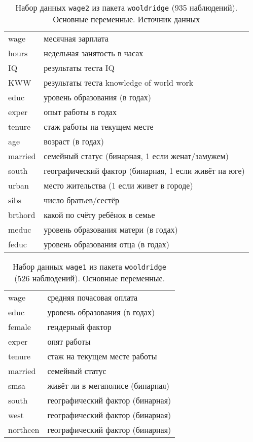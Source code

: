 \documentclass[12pt]{article}
\theoremstyle{remark}
\begin{document}
%
\begin{table}
	\caption{Набор данных \texttt{wage2} из пакета \texttt{wooldridge} (935  наблюдений).
	Основные переменные. Источник данных \cite{wage2}}
	\label{wage2}
	\begin{tabular}{l|l}\hline
	wage & месячная зарплата \\
	hours & недельная занятость в часах \\
	IQ & результаты теста IQ \\
	KWW & результаты теста knowledge of world work \\
	educ & уровень образования (в годах) \\
	exper & опыт работы в годах \\
	tenure & стаж работы на текущем месте \\
	age & возраст (в годах)  \\
	married & семейный статус (бинарная, 1 если женат/замужем) \\
	south & географический фактор (бинарная, 1 если живёт на юге) \\
	urban & место жительства (1 если живет в городе) \\
	sibs & число братьев/сестёр \\
	brthord & какой по счёту ребёнок в семье \\
	meduc & уровень образования матери (в годах) \\
	feduc & уровень образования отца (в годах) \\
	\hline
	\end{tabular}
\end{table}

\begin{table}
	\caption{Набор данных \texttt{wage1} из пакета \texttt{wooldridge} (526  наблюдений).
	Основные переменные.} %
	\label{wage1}
	\begin{tabular}{l|l}\hline
	wage & средняя почасовая оплата \\
	educ & уровень образования (в годах) \\
	female & гендерный фактор \\
	exper & опят работы \\
	tenure & стаж на текущем месте работы \\
	married & семейный статус \\
	smsa & живёт ли в мегаполисе (бинарная) \\
	south & географический фактор (бинарная) \\
	west & географический фактор (бинарная) \\
	northcen & географический фактор (бинарная) \\
	\end{tabular}
\end{table}
\end{document}
